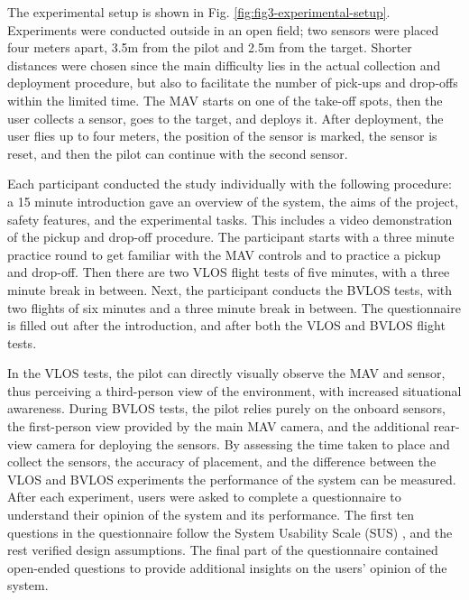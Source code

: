 The experimental setup is shown in Fig. \ref{fig:fig3-experimental-setup}. Experiments were conducted outside in an open field; two sensors were placed four meters apart, 3.5m from the pilot and 2.5m from the target. Shorter distances were chosen since the main difficulty lies in the actual collection and deployment procedure, but also to facilitate the number of pick-ups and drop-offs within the limited time. The \ac{MAV} starts on one of the take-off spots, then the user collects a sensor, goes to the target, and deploys it. After deployment, the user flies up to four meters, the position of the sensor is marked, the sensor is reset, and then the pilot can continue with the second sensor. 

Each participant conducted the study individually with the following procedure: a 15 minute introduction gave an overview of the system, the aims of the project, safety features, and the experimental tasks. This includes a video demonstration of the pickup and drop-off procedure. 
The participant starts with a three minute practice round to get familiar with the \ac{MAV} controls and to practice a pickup and drop-off. Then there are two \ac{VLOS} flight tests of five minutes, with a three minute break in between. Next, the participant conducts the \ac{BVLOS} tests, with two flights of six minutes and a three minute break in between. The questionnaire is filled out after the introduction, and after both the \ac{VLOS} and \ac{BVLOS} flight tests.


In the \ac{VLOS} tests, the pilot can directly visually observe the \ac{MAV} and sensor, thus perceiving a third-person view of the environment, with increased situational awareness. During \ac{BVLOS} tests, the pilot relies purely on the onboard sensors, the first-person view provided by the main \ac{MAV} camera, and the additional rear-view camera for deploying the sensors. By assessing the time taken to place and collect the sensors, the accuracy of placement, and the difference between the \ac{VLOS} and \ac{BVLOS} experiments  the performance of the system can be measured. After each experiment, users were asked to complete a questionnaire to understand their opinion of the system and its performance. The first ten questions in the questionnaire follow the System Usability Scale (SUS) \cite{Brooke1996}, and the rest verified design assumptions. The final part of the questionnaire contained open-ended questions to provide additional insights on the users' opinion of the system.


